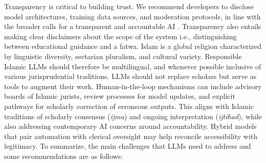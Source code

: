 \documentclass{article}
\begin{document}
Transparency is critical to building trust. We recommend developers to disclose model architectures, training data sources, and moderation protocols, in line with the broader calls for a transparent and accountable AI \citep{campbell2021}. Transparency also entails making clear disclaimers about the scope of the system i.e., distinguishing between educational guidance and a fatwa. Islam is a global religion characterized by linguistic diversity, sectarian pluralism, and cultural variety. Responsible Islamic LLMs should therefore be multilingual, and whenever possible inclusive of various jurisprudential traditions. LLMs should not replace scholars but serve as tools to augment their work. Human-in-the-loop mechanisms can include advisory boards of Islamic jurists, review processes for model updates, and explicit pathways for scholarly correction of erroneous outputs. This aligns with Islamic traditions of scholarly consensus (\textit{ijma}) and ongoing interpretation (\textit{ijtihad}), while also addressing contemporary AI concerns around accountability. Hybrid models that pair automation with clerical oversight may help reconcile accessibility with legitimacy. To summarize, the main challenges that LLMs need to address and some recommendations are as follows:
\end{document}
